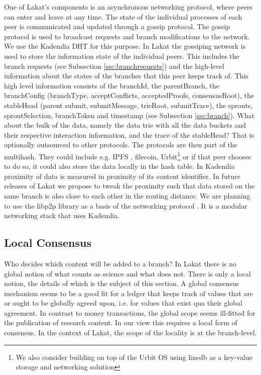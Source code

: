 One of Lakat's components is an asynchronous networking protocol, where peers can enter and leave at any time. The state of the individual processes of each peer is communicated and updated through a gossip protocol. The gossip protocol is used to broadcast requests and branch modifications to the network. We use the Kademlia DHT for this purpose. In Lakat the gossiping network is used to store the information state of the individual peers. This includes the branch requests (see Subsection \ref{ssc:branchrequests}) and the high-level information about the states of the branches that this peer keeps track of. This high level information consists of the branchId, the parentBranch, the branchConfig (branchType, acceptConflicts, acceptedProofs, consensusRoot), the stableHead (parent submit, submitMessage, trieRoot, submitTrace), the sprouts, sproutSelection, branchToken and timestamp (see Subsection \ref{ssc:branch}). What about the bulk of the data, namely the data trie with all the data buckets and their respective interaction information, and the trace of the stableHead? That is optionally outsourced to other protocols. The protocols are then part of the multihash. They could include e.g. IPFS \cite{psaras2020interplanetary, guidi2021data}, filecoin, Urbit\footnote{We also consider building on top of the Urbit OS using linedb\cite{linedb} as a key-value storage and networking solution} or if that peer chooses to do so, it could also store the data locally in the hash table. In Kademlia proximity of data is measured in proximity of its content identifier. In future releases of Lakat we propose to tweak the proximity such that data stored on the same branch is also close to each other in the routing distance. We are planning to use the libp2p library as a basis of the networking protocol \cite{libp2p}. It is a modular networking stack that uses Kademlia.  


\subsection{Local Consensus}
\label{ssc:localconsensus}

Who decides which content will be added to a branch? In Lakat there is no global notion of what counts as science and what does not. There is only a local notion, the details of which is the subject of this section. A global consensus mechanism seems to be a good fit for a ledger that keeps track of values that are or ought to be globally agreed upon, i.e. for values that exist qua their global agreement. In contrast to money transactions, the global scope seems ill-fitted for the publication of research content. In our view this requires a local form of consensus. In the context of Lakat, the scope of the locality is at the branch-level. 

